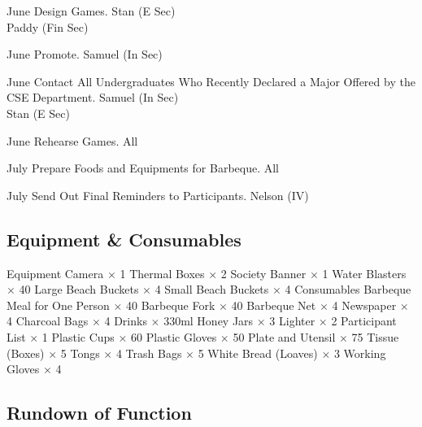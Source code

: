 \bTR{}
\eTD{} June
\eTD\bTD Design Games.
\eTD\bTD Stan (E Sec) \\ Paddy (Fin Sec)
\eTD\eTR

\bTR{}
\eTD{} June
\eTD\bTD Promote.
\eTD\bTD Samuel (In Sec)
\eTD\eTR

\bTR{}
\eTD{} June
\eTD\bTD Contact All Undergraduates Who Recently Declared a Major Offered by the CSE Department.
\eTD\bTD Samuel (In Sec) \\ Stan (E Sec)
\eTD\eTR

\bTR{}
\eTD{} June
\eTD\bTD Rehearse Games.
\eTD\bTD All
\eTD\eTR

\bTR{}
\eTD{} July
\eTD\bTD Prepare Foods and Equipments for Barbeque.
\eTD\bTD All
\eTD\eTR

\bTR{}
\eTD{} July
\eTD\bTD Send Out Final Reminders to Participants.
\eTD\bTD Nelson (IV)
\eTD\eTR

\eTABLEbody
\eTABLE

\subsection{Equipment \& Consumables}
\starttabulate[|l|l|]
\NC{}Equipment\NC\NR
\HL
\NC Camera                  \NC $\times$ 1  \NR
\NC Thermal Boxes           \NC $\times$ 2  \NR
\NC Society Banner          \NC $\times$ 1  \NR
\NC Water Blasters          \NC $\times$ 40 \NR
\NC Large Beach Buckets     \NC $\times$ 4  \NR
\NC Small Beach Buckets     \NC $\times$ 4  \NR
\HL
\NR
\NC{}Consumables\NC\NR
\HL
\NC Barbeque Meal for One Person \NC $\times$ 40  \NR
\NC Barbeque Fork \NC $\times$ 40  \NR
\NC Barbeque Net \NC $\times$ 4  \NR
\NC Newspaper \NC $\times$ 4  \NR
\NC Charcoal Bags \NC $\times$ 4  \NR
\NC Drinks  $\times$ 330ml  \NR
\NC Honey Jars \NC $\times$ 3  \NR
\NC Lighter \NC $\times$ 2  \NR
\NC Participant List \NC $\times$ 1  \NR
\NC Plastic Cups \NC $\times$ 60  \NR
\NC Plastic Gloves \NC $\times$ 50  \NR
\NC Plate and Utensil \NC $\times$ 75  \NR
\NC Tissue (Boxes) \NC $\times$ 5  \NR
\NC Tongs \NC $\times$ 4  \NR
\NC Trash Bags \NC $\times$ 5  \NR
\NC White Bread (Loaves) \NC $\times$ 3  \NR
\NC Working Gloves \NC $\times$ 4  \NR
\HL
\stoptabulate

\subsection{Rundown of Function}


